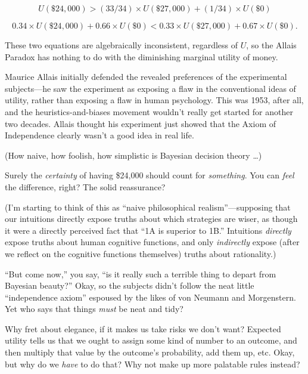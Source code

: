\begin{equation*}
U(\$24,000) > (33/34) \times U(\$27,000) +
(1/34) \times U(\$0)
\end{equation*}

\begin{equation*}
0.34 \times U(\$24,000) + 0.66 \times U(\$0)
< 0.33 \times U(\$27,000) + 0.67 \times U(\$0).
\end{equation*}


{
 These two equations are algebraically inconsistent, regardless of
$U$, so the Allais Paradox has nothing to do with the diminishing
marginal utility of money. }

{
 Maurice Allais initially defended the revealed preferences of the
experimental subjects---he saw the experiment as exposing a flaw in the
conventional ideas of utility, rather than exposing a flaw in human
psychology. This was 1953, after all, and the heuristics-and-biases
movement wouldn't really get started for another two
decades. Allais thought his experiment just showed that the Axiom of
Independence clearly wasn't a good idea in real life.}

{
 (How naive, how foolish, how simplistic is Bayesian decision
theory \ldots)}

{
 Surely the \textit{certainty} of having \$24,000 should count for
\textit{something}. You can \textit{feel} the difference, right? The
solid reassurance?}

{
 (I'm starting to think of this as
``naive philosophical
realism''---supposing that our intuitions directly
expose truths about which strategies are wiser, as though it were a
directly perceived fact that ``1A is superior to
1B.'' Intuitions \textit{directly} expose truths
about human cognitive functions, and only \textit{indirectly} expose
(after we reflect on the cognitive functions themselves) truths about
rationality.)}

{
 ``But come now,'' you say,
``is it really such a terrible thing to depart from
Bayesian beauty?'' Okay, so the subjects
didn't follow the neat little
``independence axiom'' espoused by
the likes of von Neumann and Morgenstern. Yet who says that things
\textit{must} be neat and tidy?}

{
 Why fret about elegance, if it makes us take risks we
don't want? Expected utility tells us that we ought to
assign some kind of number to an outcome, and then multiply that value
by the outcome's probability, add them up, etc. Okay,
but why do we \textit{have} to do that? Why not make up more palatable
rules instead?}

